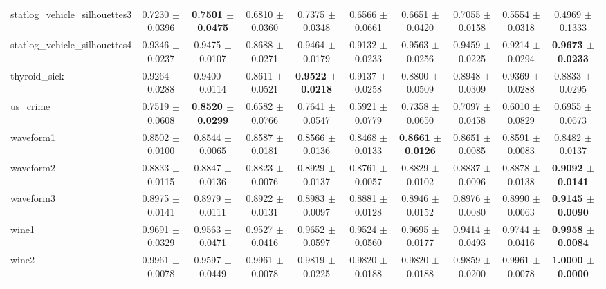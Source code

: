 \begin{table*}[htbp]
{\begin{tabular}{lccccccccc}
            statlog\_vehicle\_silhouettes3 & 0.7230 $\pm$ 0.0396 & \cellcolor{graybg}\textbf{0.7501 $\pm$ 0.0475} & 0.6810 $\pm$ 0.0360 & 0.7375 $\pm$ 0.0348 & 0.6566 $\pm$ 0.0661 & 0.6651 $\pm$ 0.0420 & 0.7055 $\pm$ 0.0158 & 0.5554 $\pm$ 0.0318 & 0.4969 $\pm$ 0.1333 \\ 
            statlog\_vehicle\_silhouettes4 & 0.9346 $\pm$ 0.0237 & 0.9475 $\pm$ 0.0107 & 0.8688 $\pm$ 0.0271 & 0.9464 $\pm$ 0.0179 & 0.9132 $\pm$ 0.0233 & 0.9563 $\pm$ 0.0256 & 0.9459 $\pm$ 0.0225 & 0.9214 $\pm$ 0.0294 & \cellcolor{graybg}\textbf{0.9673 $\pm$ 0.0233} \\ 
            thyroid\_sick & 0.9264 $\pm$ 0.0288 & 0.9400 $\pm$ 0.0114 & 0.8611 $\pm$ 0.0521 & \cellcolor{graybg}\textbf{0.9522 $\pm$ 0.0218} & 0.9137 $\pm$ 0.0258 & 0.8800 $\pm$ 0.0509 & 0.8948 $\pm$ 0.0309 & 0.9369 $\pm$ 0.0288 & 0.8833 $\pm$ 0.0295 \\ 
            us\_crime & 0.7519 $\pm$ 0.0608 & \cellcolor{graybg}\textbf{0.8520 $\pm$ 0.0299} & 0.6582 $\pm$ 0.0766 & 0.7641 $\pm$ 0.0547 & 0.5921 $\pm$ 0.0779 & 0.7358 $\pm$ 0.0650 & 0.7097 $\pm$ 0.0458 & 0.6010 $\pm$ 0.0829 & 0.6955 $\pm$ 0.0673 \\ 
            waveform1 & 0.8502 $\pm$ 0.0100 & 0.8544 $\pm$ 0.0065 & 0.8587 $\pm$ 0.0181 & 0.8566 $\pm$ 0.0136 & 0.8468 $\pm$ 0.0133 & \cellcolor{graybg}\textbf{0.8661 $\pm$ 0.0126} & 0.8651 $\pm$ 0.0085 & 0.8591 $\pm$ 0.0083 & 0.8482 $\pm$ 0.0137 \\ 
            waveform2 & 0.8833 $\pm$ 0.0115 & 0.8847 $\pm$ 0.0136 & 0.8823 $\pm$ 0.0076 & 0.8929 $\pm$ 0.0137 & 0.8761 $\pm$ 0.0057 & 0.8829 $\pm$ 0.0102 & 0.8837 $\pm$ 0.0096 & 0.8878 $\pm$ 0.0138 & \cellcolor{graybg}\textbf{0.9092 $\pm$ 0.0141} \\ 
            waveform3 & 0.8975 $\pm$ 0.0141 & 0.8979 $\pm$ 0.0111 & 0.8922 $\pm$ 0.0131 & 0.8983 $\pm$ 0.0097 & 0.8881 $\pm$ 0.0128 & 0.8946 $\pm$ 0.0152 & 0.8976 $\pm$ 0.0080 & 0.8990 $\pm$ 0.0063 & \cellcolor{graybg}\textbf{0.9145 $\pm$ 0.0090} \\ 
            wine1 & 0.9691 $\pm$ 0.0329 & 0.9563 $\pm$ 0.0471 & 0.9527 $\pm$ 0.0416 & 0.9652 $\pm$ 0.0597 & 0.9524 $\pm$ 0.0560 & 0.9695 $\pm$ 0.0177 & 0.9414 $\pm$ 0.0493 & 0.9744 $\pm$ 0.0416 & \cellcolor{graybg}\textbf{0.9958 $\pm$ 0.0084} \\ 
            wine2 & 0.9961 $\pm$ 0.0078 & 0.9597 $\pm$ 0.0449 & 0.9961 $\pm$ 0.0078 & 0.9819 $\pm$ 0.0225 & 0.9820 $\pm$ 0.0188 & 0.9820 $\pm$ 0.0188 & 0.9859 $\pm$ 0.0200 & 0.9961 $\pm$ 0.0078 & \cellcolor{graybg}\textbf{1.0000 $\pm$ 0.0000} \\ 

\end{tabular}}
\end{table*}
